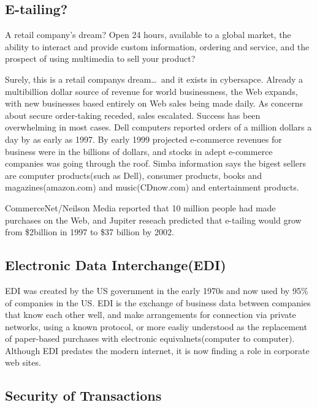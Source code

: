 \documentclass{article}      %
\begin{document}
\subsection{E-tailing?}

A retail company's dream?  Open 24 hours, available to a global market, the ability to interact and 
provide custom information, ordering and service, and the prospect of using multimedia to sell your
product?

Surely, this is a retail companys dream\ldots\ and it exists in cybersapce.  Already a multibillion
dollar source of revenue for world businessness, the Web expands, with new businesses based entirely on
Web sales being made daily.
As concerns about secure  order-taking receded, sales escalated.
Success has been overwhelming in most cases. Dell computers reported orders of a million dollars a day
by as early as 1997.  By early 1999 projected e-commerce revenues for business were in the billions of
dollars, and stocks in adept e-commerce companies was going through the roof\cite{Builder:url}.  Simba information says 
the bigest sellers are computer products(such as Dell), consumer products, books and magazines(amazon.com)
and music(CDnow.com) and entertainment products\cite{Builder:url}.

CommerceNet/Neilson Media reported that 10 million people had made purchases on the Web, and Jupiter reseach predicted
that e-tailing would grow from \$2billion in 1997 to \$37 billion by 2002\cite{Builder:url}.



\subsection{Electronic Data Interchange(EDI)}

EDI was created by the US government in the early 1970s and now used by 95\% of
companies in the US.  EDI is the exchange of business data 
between companies that know each other well, and make arrangements for connection
via private networks, using a known protocol, or more easliy understood as the replacement
 of paper-based purchases with electronic equivalnets(computer to computer).
 Although EDI predates the modern internet, it is
now finding a role in corporate web sites.


\subsection{Security of Transactions}
\end{document}
